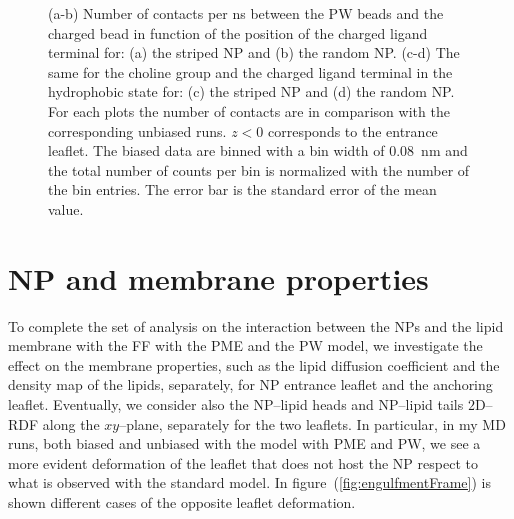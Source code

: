 \begin{figure}[ht!]
{		}
		\caption{(a-b) Number of contacts per ns between the \acs{PW} beads and the charged bead in function of the position of the charged ligand terminal for: (a) the striped \acs{NP} and (b) the random \acs{NP}. (c-d) The same for the choline group and the charged ligand terminal in the hydrophobic state for: (c) the striped \ac{NP} and (d) the random \acs{NP}. For each plots the number of contacts are in comparison with the corresponding unbiased runs.  $z<0$ corresponds to the entrance leaflet. The biased data are binned with a bin width of $0.08$~nm and the total number of counts per bin is normalized with the number of the bin entries. The error bar is the standard error of the mean value.}%
		\label{fig:contactsUn}
\end{figure}
\section{NP and membrane properties}
To complete the set of analysis on the interaction between the \acp{NP} and the lipid membrane with the \martini \ac{FF} with the \ac{PME} and the \ac{PW} model, we investigate the effect on the membrane properties, such as the lipid diffusion coefficient and the density map of the lipids, separately, for \ac{NP} entrance leaflet and the anchoring leaflet. Eventually, we consider also the \ac{NP}--lipid heads and \ac{NP}--lipid tails $2$D--\ac{RDF} along the $xy$--plane, separately for the two leaflets. In particular, in my \ac{MD} runs, both biased and unbiased with the \martini model with \ac{PME} and \ac{PW}, we see a more evident deformation of the leaflet that does not host the \ac{NP} respect to what is observed with the standard \martini model. In figure~(\ref{fig:engulfmentFrame}) is shown different cases of the opposite leaflet deformation.


